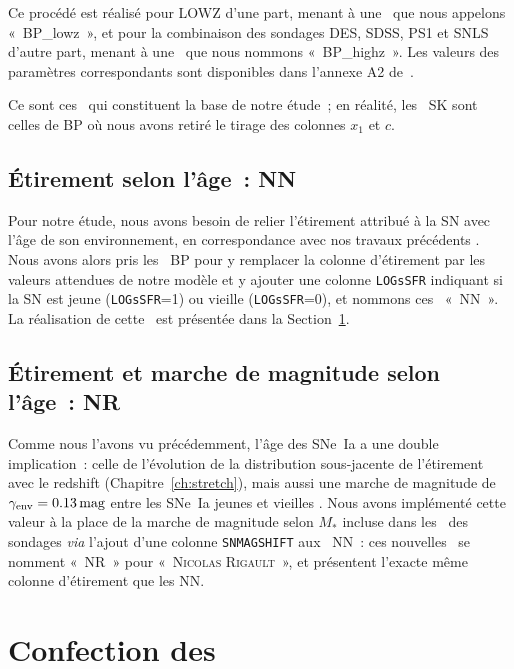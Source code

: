 \documentclass[../main/main.tex]{subfiles}
\begin{document}
Ce procédé est réalisé pour LOWZ d'une part, menant à une \hostlib\ que nous
appelons «~BP\_lowz~», et pour la combinaison des sondages DES, SDSS, PS1 et
SNLS d'autre part, menant à une \hostlib\ que nous nommons «~BP\_highz~». Les
valeurs des paramètres correspondants sont disponibles dans l'annexe A2
de~.

Ce sont ces \hostlib\ qui constituent la base de notre étude~; en réalité, les
\hostlib\ SK sont celles de BP où nous avons retiré le tirage des colonnes $x_1$
et $c$.

\subsection{Étirement selon l'âge~: NN}\label{ssec:nn}

Pour notre étude, nous avons besoin de relier l'étirement attribué à la SN avec
l'âge de son environnement, en correspondance avec nos travaux précédents
\citep[][ci-après NN]{nicolas2021}. Nous avons
alors pris les \hostlib\ BP pour y remplacer la colonne d'étirement par les
valeurs attendues de notre modèle et y ajouter une colonne \texttt{LOGsSFR}
indiquant si la SN est jeune (\texttt{LOGsSFR}=1) ou vieille
(\texttt{LOGsSFR}=0), et nommons ces \hostlib\ «~NN~». La réalisation de cette
\hostlib\ est présentée dans la Section~\ref{sec:hmake}.

\subsection{Étirement et marche de magnitude selon l'âge~: NR}\label{ssec:nr}

Comme nous l'avons vu précédemment, l'âge des SNe~Ia a une double implication~:
celle de l'évolution de la distribution sous-jacente de l'étirement avec le
redshift (Chapitre~\ref{ch:stretch}), mais aussi une marche de magnitude de
$\gamma_{\rm env} = \SI{0,13}{mag}$ entre les SNe~Ia jeunes et vieilles
\citep[Chapitre~\ref{ch:stretch},][]{rigault2020}. Nous avons implémenté cette
valeur à la place de la marche de magnitude selon $M_*$ incluse dans les
\wgtmap\ des sondages \textit{via} l'ajout d'une colonne \texttt{SNMAGSHIFT} aux
\hostlib\ NN~: ces nouvelles \hostlib\ se nomment «~NR~» pour «~\textsc{Nicolas}
\textsc{Rigault}~», et présentent l'exacte même colonne d'étirement que les NN.

\section{Confection des \hostlib}\label{sec:hmake}
\end{document}

